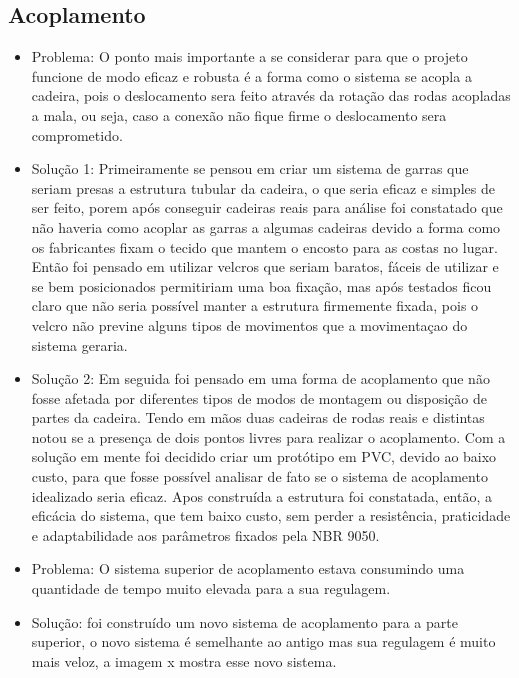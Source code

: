 \subsection{Acoplamento}
 \begin{itemize}
  \item Problema: O ponto mais importante a se considerar para que o projeto funcione de modo eficaz e robusta é a forma como o sistema se acopla a cadeira, pois o deslocamento sera feito através da rotação das rodas acopladas a mala, ou seja, caso  a conexão não fique firme o deslocamento sera comprometido.
  \item Solução 1: Primeiramente se pensou em criar um sistema de garras que seriam presas a estrutura tubular da cadeira, o que seria eficaz e simples de ser feito, porem após conseguir cadeiras reais para análise foi constatado que não haveria como acoplar as garras a algumas cadeiras devido a forma como os fabricantes fixam o tecido que mantem o encosto para as costas no lugar. Então foi pensado em utilizar velcros que seriam baratos, fáceis de utilizar e se bem posicionados permitiriam uma boa fixação, mas após testados ficou claro que não seria possível manter a estrutura firmemente fixada, pois o velcro não previne alguns tipos de movimentos que a movimentaçao do sistema geraria.

  \item Solução 2: Em seguida foi pensado em uma forma de acoplamento que não fosse afetada por diferentes tipos de modos de montagem ou disposição de partes da cadeira. Tendo em mãos duas cadeiras de rodas reais e distintas notou se a presença de dois pontos livres para realizar o acoplamento. Com a solução em mente foi decidido criar um protótipo em PVC, devido ao baixo custo, para que fosse possível analisar de fato se o sistema de acoplamento idealizado seria eficaz. Apos construída a estrutura foi constatada, então, a eficácia do sistema, que tem baixo custo, sem perder a resistência, praticidade e adaptabilidade aos parâmetros fixados pela NBR 9050.
 \end{itemize}

 \begin{itemize}
   \item Problema: O sistema superior de acoplamento estava consumindo uma quantidade de tempo muito elevada para a sua regulagem.
   \item Solução: foi construído um novo sistema de acoplamento para a parte superior, o novo sistema é semelhante ao antigo mas sua regulagem é muito mais veloz, a imagem x mostra esse novo sistema.
 \end{itemize}

